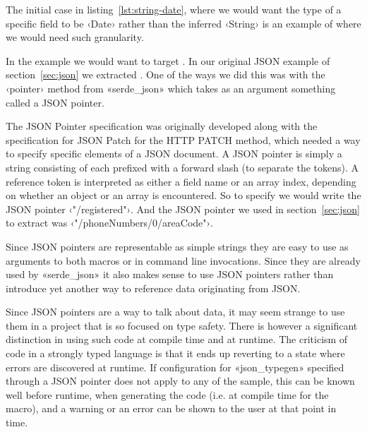 The initial case in listing~\ref{lst:string-date}, where we would want the type of a specific field to be ‹Date› rather than the inferred ‹String› is an example of where we would need such granularity.

In the example we would want to target . In our original JSON example of section~\ref{sec:json} we extracted . One of the ways we did this was with the ‹pointer› method from «serde_json» which takes as an argument something called a JSON pointer.

The JSON Pointer specification\cite{RFC6901} was originally developed along with the specification for JSON Patch\cite{RFC6902} for the HTTP PATCH method, which needed a way to specify specific elements of a JSON document. A JSON pointer is simply a string consisting of  each prefixed with a forward slash (to separate the tokens). A reference token is interpreted as either a field name or an array index, depending on whether an object or an array is encountered. So to specify  we would write the JSON pointer ‹"/registered"›. And the JSON pointer we used in section~\ref{sec:json} to extract  was ‹"/phoneNumbers/0/areaCode"›.

Since JSON pointers are representable as simple strings they are easy to use as arguments to both macros or in command line invocations. Since they are already used by «serde_json» it also makes sense to use JSON pointers rather than introduce yet another way to reference data originating from JSON.

Since JSON pointers are a  way to talk about data, it may seem strange to use them in a project that is so focused on type safety. There is however a significant distinction in using such code at compile time and at runtime. The criticism of  code in a strongly typed language is that it ends up reverting to a state where errors are discovered at runtime. If configuration for «json_typegen» specified through a JSON pointer does not apply to any of the sample, this can be known well before runtime, when generating the code (i.e. at compile time for the macro), and a warning or an error can be shown to the user at that point in time.


